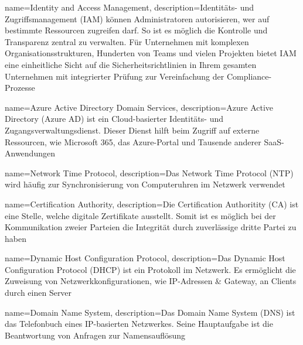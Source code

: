 


{
    name=Identity and Access Management,
    description={Identitäts- und Zugriffsmanagement (IAM) können Administratoren autorisieren, wer auf bestimmte Ressourcen zugreifen darf.
    So ist es möglich die Kontrolle und Transparenz zentral zu verwalten.
    Für Unternehmen mit komplexen Organisationsstrukturen, Hunderten von Teams und vielen Projekten bietet IAM eine einheitliche Sicht auf die Sicherheitsrichtlinien in Ihrem gesamten Unternehmen mit integrierter Prüfung zur Vereinfachung der Compliance-Prozesse}
}

{
    name=Azure Active Directory Domain Services,
    description={Azure Active Directory (Azure AD) ist ein Cloud-basierter Identitäts- und Zugangsverwaltungsdienst.
    Dieser Dienst hilft beim Zugriff auf externe Ressourcen, wie Microsoft 365, das Azure-Portal und Tausende anderer SaaS-Anwendungen}
}

{
    name=Network Time Protocol,
    description={Das Network Time Protocol (NTP) wird häufig zur Synchronisierung von Computeruhren im Netzwerk verwendet}
}

{
    name=Certification Authority,
    description={Die Certification Authoritity (CA) ist eine Stelle, welche digitale Zertifikate ausstellt. Somit ist es möglich bei der Kommunikation zweier Parteien die Integrität durch zuverlässige dritte Partei zu haben}
}

{
    name=Dynamic Host Configuration Protocol,
    description={Das Dynamic Host Configuration Protocol (DHCP) ist ein Protokoll im Netzwerk. Es ermöglicht die Zuweisung von Netzwerkkonfigurationen, wie IP-Adressen \& Gateway, an Clients durch einen Server}
}

{
    name=Domain Name System,
    description={Das Domain Name System (DNS) ist das Telefonbuch eines IP-basierten Netzwerkes. Seine Hauptaufgabe ist die Beantwortung von Anfragen zur Namensauflösung}
}